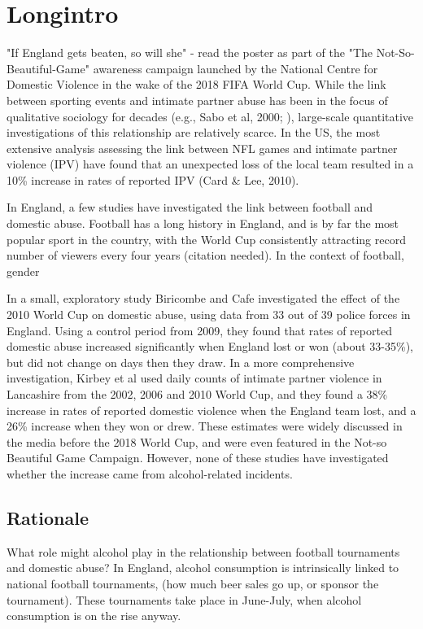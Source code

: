 \documentclass[12pt, letterpaper]{article}
\begin{document}
\section{Longintro}

"If England gets beaten, so will she" - read the poster as part of the "The Not-So-Beautiful-Game" awareness campaign launched by the National Centre for Domestic Violence in the wake of the 2018 FIFA World Cup. While the link between sporting events and intimate partner abuse has been in the focus of qualitative sociology for decades (e.g., Sabo et al, 2000; ), large-scale quantitative investigations of this relationship are relatively scarce. In the US, the most extensive analysis assessing the link between NFL games and intimate partner violence (IPV) have found that an unexpected loss of the local team resulted in a 10\% increase in rates of reported IPV (Card \& Lee, 2010). 

In England, a few studies have investigated the link between football and domestic abuse. Football has a long history in England, and is by far the most popular sport in the country, with the World Cup consistently attracting record number of viewers every four years (citation needed). In the context of football, gender 

In a small, exploratory study Biricombe and Cafe investigated the effect of the 2010 World Cup on domestic abuse, using data from 33 out of 39 police forces in England. Using a control period from 2009, they found that rates of reported domestic abuse increased significantly when England lost or won (about 33-35\%), but did not change on days then they draw. In a more comprehensive investigation, Kirbey et al used daily counts of intimate partner violence in Lancashire from the 2002, 2006 and 2010 World Cup, and they found a 38\% increase in rates of reported domestic violence when the England team lost, and a 26\% increase when they won or drew. These estimates were widely discussed in the media before the 2018 World Cup, and were even featured in the Not-so Beautiful Game Campaign.  However, none of these studies have investigated whether the increase came from alcohol-related incidents.

\subsection{Rationale}

What role might alcohol play in the relationship between football tournaments and domestic abuse? In England, alcohol consumption is intrinsically linked to national football tournaments, (how much beer sales go up, or sponsor the tournament). These tournaments take place in June-July, when alcohol consumption is on the rise anyway.  
\end{document}
